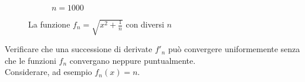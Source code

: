 \begin{exercise}
\begin{figure}[H]
\begin{subfigure}{.24\textwidth}
			\centering
			\caption{$n = 1000$}
		\end{subfigure}
		\caption{La funzione $f_n = \sqrt{x^2 + \frac{1}{n}}$ con diversi $n$}
		\label{fig:fn_sqrt_x2_1_over_n}
	\end{figure}
\end{exercise}
\begin{exercise}
	Verificare che una successione di derivate $f'_n$ può convergere uniformemente senza che le funzioni $f_n$ convergano neppure puntualmente.\\
	Considerare, ad esempio $f_n(x) = n$.
\end{exercise}

